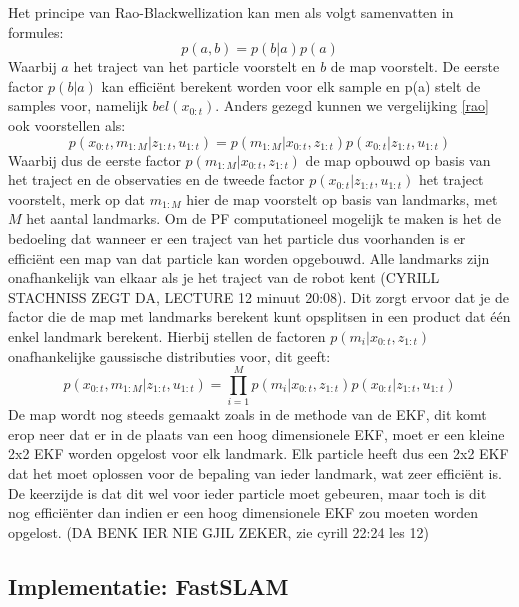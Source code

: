 \documentclass{book}
\begin{document}
Het principe van Rao-Blackwellization kan men als volgt samenvatten in formules:
\begin{equation}
p(a,b) = p(b|a) p(a)
\label{rao}
\end{equation}
Waarbij $a$ het traject van het particle voorstelt en $b$ de map voorstelt. De eerste factor $p(b|a)$ kan efficiënt berekent worden voor elk sample en p(a) stelt de samples voor, namelijk $bel(x_{0:t})$. Anders gezegd kunnen we vergelijking \ref{rao} ook voorstellen als:
\begin{equation}
p(x_{0:t},m_{1:M}|z_{1:t},u_{1:t})= p(m_{1:M}|x_{0:t},z_{1:t})p(x_{0:t}|z_{1:t},u_{1:t}) 
\end{equation}
Waarbij dus de eerste factor $p(m_{1:M}|x_{0:t},z_{1:t})$ de map opbouwd op basis van het traject en de observaties en de tweede factor $p(x_{0:t}|z_{1:t},u_{1:t})$ het traject voorstelt, merk op dat $m_{1:M}$ hier de map voorstelt op basis van landmarks, met $M$ het aantal landmarks.
Om de PF computationeel mogelijk te maken is het de bedoeling dat wanneer er een traject van het particle dus voorhanden is er efficiënt een map van dat particle kan worden opgebouwd. Alle landmarks zijn onafhankelijk van elkaar als je het traject van de robot kent (CYRILL STACHNISS ZEGT DA, LECTURE 12 minuut 20:08). Dit zorgt ervoor dat je de factor die de map met landmarks berekent kunt opsplitsen in een product dat één enkel landmark berekent. Hierbij stellen de factoren $p(m_{i}|x_{0:t},z_{1:t})$ onafhankelijke gaussische distributies voor, dit geeft:
\begin{equation}
p(x_{0:t},m_{1:M}|z_{1:t},u_{1:t})= \prod_{i=1}^Mp(m_{i}|x_{0:t},z_{1:t})p(x_{0:t}|z_{1:t},u_{1:t}) 
\end{equation}
De map wordt nog steeds gemaakt zoals in de methode van de EKF, dit komt erop neer dat er in de plaats van een hoog dimensionele EKF, moet er een kleine 2x2 EKF worden opgelost voor elk landmark. Elk particle heeft dus een 2x2 EKF dat het moet oplossen voor de bepaling van ieder landmark, wat zeer efficiënt is. De keerzijde is dat dit wel voor ieder particle moet gebeuren, maar toch is dit nog efficiënter dan indien er een hoog dimensionele EKF zou moeten worden opgelost. (DA BENK IER NIE GJIL ZEKER, zie cyrill 22:24 les 12) 

\subsection{Implementatie: FastSLAM}
\end{document}
